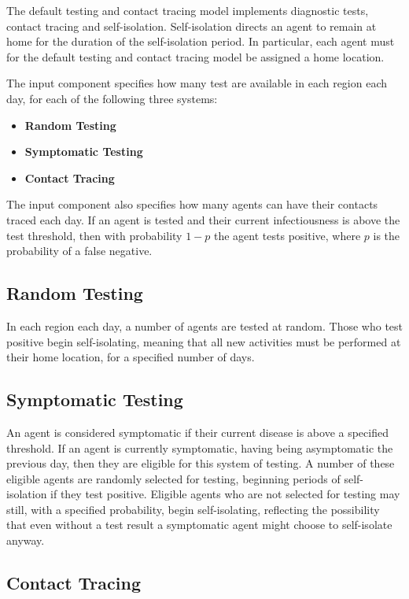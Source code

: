 \documentclass[10pt,letterpaper]{article}
\begin{document}
The default testing and contact tracing model implements diagnostic tests, contact tracing and self-isolation. Self-isolation directs an agent to remain at home for the duration of the self-isolation period. In particular, each agent must for the default testing and contact tracing model be assigned a home location.

The input component specifies how many test are available in each region each day, for each of the following three systems:
\begin{itemize}
\item \textbf{Random Testing}
\item \textbf{Symptomatic Testing}
\item \textbf{Contact Tracing}
\end{itemize}
The input component also specifies how many agents can have their contacts traced each day. If an agent is tested and their current infectiousness is above the test threshold, then with probability $ 1 - p $ the agent tests positive, where $p$ is the probability of a false negative.

\subsection{Random Testing}

In each region each day, a number of agents are tested at random. Those who test positive begin self-isolating, meaning that all new activities must be performed at their home location, for a specified number of days.

\subsection{Symptomatic Testing}

An agent is considered symptomatic if their current disease is above a specified threshold. If an agent is currently symptomatic, having being asymptomatic the previous day, then they are eligible for this system of testing. A number of these eligible agents are randomly selected for testing, beginning periods of self-isolation if they test positive. Eligible agents who are not selected for testing may still, with a specified probability, begin self-isolating, reflecting the possibility that even without a test result a symptomatic agent might choose to self-isolate anyway.

\subsection{Contact Tracing}
\end{document}
